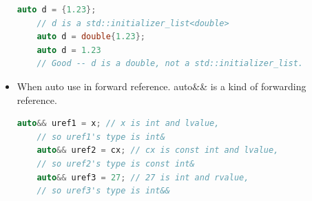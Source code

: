 \documentclass[a4paper,12pt,twoside]{book}
\begin{document}
\begin{itemize}
	\begin{lstlisting}[frame=single, language=c++]
	auto d = {1.23};
	// d is a std::initializer_list<double>
	auto d = double{1.23};
	auto d = 1.23
	// Good -- d is a double, not a std::initializer_list.
	\end{lstlisting}
	
	\item When auto use in forward reference. auto\&\& is a kind of forwarding reference.
	\begin{lstlisting}[frame=single, language=c++]
	auto&& uref1 = x; // x is int and lvalue,
	// so uref1's type is int&
	auto&& uref2 = cx; // cx is const int and lvalue,
	// so uref2's type is const int&
	auto&& uref3 = 27; // 27 is int and rvalue,
	// so uref3's type is int&&
	\end{lstlisting}
	
	
	
\end{itemize}
\end{document}
